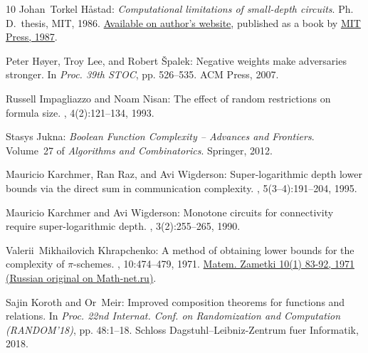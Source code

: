\documentclass[11pt]{article}
\numberwithin{equation}{section}
\theoremstyle{definition}
\theoremstyle{plain}
\theoremstyle{definition}\newtheorem{notation}[theorem]{Notation}\theoremstyle{plain}
\begin{document}
\begin{thebibliography}{10}
{\sc Johan~Torkel H{\aa}stad}: {\em Computational limitations of small-depth
  circuits}.
\newblock Ph.\,D.\ thesis, MIT, 1986.
\newblock \href{https://www.csc.kth.se/~johanh/thesis_with_figs.pdf}{Available
  on author's website}, published as a book by
  \href{https://mitpress.mit.edu/9780262081672/computational-limitations-for-small-depth-circuits/}{MIT
  Press, 1987}.

{\sc Peter H{\o}yer, Troy Lee, and Robert {\v{S}}palek}: Negative weights make
  adversaries stronger.
\newblock In {\em Proc. 39th STOC}, pp. 526--535. ACM Press, 2007.
\newblock [\epfmtdoi{10.1145/1250790.1250867}]

{\sc Russell Impagliazzo and Noam Nisan}: The effect of random restrictions on
  formula size.
, 4(2):121--134, 1993.

{\sc Stasys Jukna}: {\em {B}oolean Function Complexity -- Advances and
  Frontiers}.
\newblock Volume~27 of {\em Algorithms and Combinatorics}.
\newblock Springer, 2012.
\newblock [\epfmtdoi{10.1007/978-3-642-24508-4}]

{\sc Mauricio Karchmer, Ran Raz, and Avi Wigderson}: Super-logarithmic depth
  lower bounds via the direct sum in communication complexity.
, 5(3--4):191--204, 1995.
\newblock [\epfmtdoi{10.1007/BF01206317}]

{\sc Mauricio Karchmer and Avi Wigderson}: Monotone circuits for connectivity
  require super-logarithmic depth.
, 3(2):255--265, 1990.
\newblock [\epfmtdoi{10.1137/0403021}]

{\sc Valerii~Mikhailovich Khrapchenko}: A method of obtaining lower bounds for
  the complexity of {$\pi$}-schemes.
,
  10:474--479, 1971.
\newblock \href{https://mi.mathnet.ru/mzm7071}{Matem. Zametki 10(1) 83-92, 1971
  (Russian original on Math-net.ru)}.
\newblock [\epfmtdoi{10.1007/BF01747074}]

{\sc Sajin Koroth and Or~Meir}: Improved composition theorems for functions and
  relations.
\newblock In {\em Proc. 22nd Internat. Conf. on Randomization and Computation
  (RANDOM'18)}, pp. 48:1--18. Schloss Dagstuhl--Leibniz-Zentrum fuer
  Informatik, 2018.


\end{thebibliography}
\end{document}
